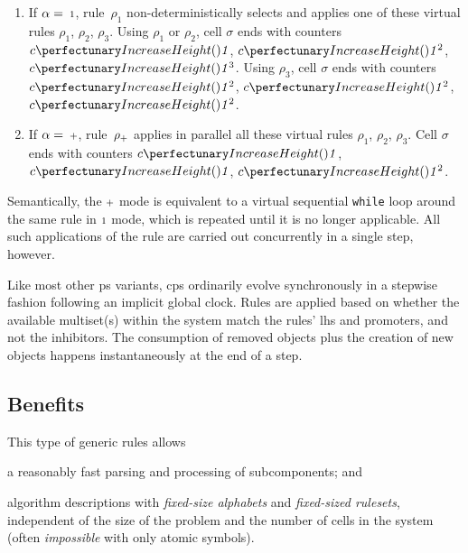 \begin{enumerate}
\item If \(\alpha = \: {\scriptstyle 1}\), rule~\(\rho_1\) 
non-deterministically selects and applies one of these virtual rules \(\rho_1\), \(\rho_2\), \(\rho_3\).
Using \(\rho_1\) or \(\rho_2\), 
cell \(\sigma\) ends with counters \(\cpfunc{c}{\cpundig}\), \(\cpfunc{c}{\cpundig^2}\), \(\cpfunc{c}{\cpundig^3}\).
Using \(\rho_3\),
cell \(\sigma\) ends with counters \(\cpfunc{c}{\cpundig^2}\), \(\cpfunc{c}{\cpundig^2}\), \(\cpfunc{c}{\cpundig^2}\).

\smallskip
\item If \(\alpha = \: {\scriptstyle +}\), rule~\(\rho_{\scriptstyle +}\) 
applies in parallel all these virtual rules \(\rho_1\), \(\rho_2\), \(\rho_3\).
Cell \(\sigma\) ends with counters \(\cpfunc{c}{\cpundig}\), \(\cpfunc{c}{\cpundig}\), \(\cpfunc{c}{\cpundig^2}\).
\end{enumerate}

Semantically, the \({\scriptstyle +}\) mode is equivalent to a virtual sequential \texttt{while} loop around the same rule in \({\scriptstyle 1}\) mode, which is repeated until it is no longer applicable.  All such applications of the rule are carried out concurrently in a single step, however.

Like most other \gls{ps} variants, \gls{cps} ordinarily evolve synchronously in a stepwise fashion following an implicit global clock.  Rules are applied based on whether the available multiset(s) within the system match the rules' \gls{lhs} and promoters, and not the inhibitors.  The consumption of removed objects plus the creation of new objects happens instantaneously at the end of a step.

\subsection{Benefits}
This type of generic rules allows
\begin{inparaenum}[(i)]
\item a reasonably fast parsing and processing of subcomponents; and
\item algorithm descriptions with \emph{fixed-size alphabets} and \emph{fixed-sized \glspl{ruleset}}, 
independent of the size of the problem and the number of cells in the system (often \emph{impossible} with only atomic symbols).
\end{inparaenum}

